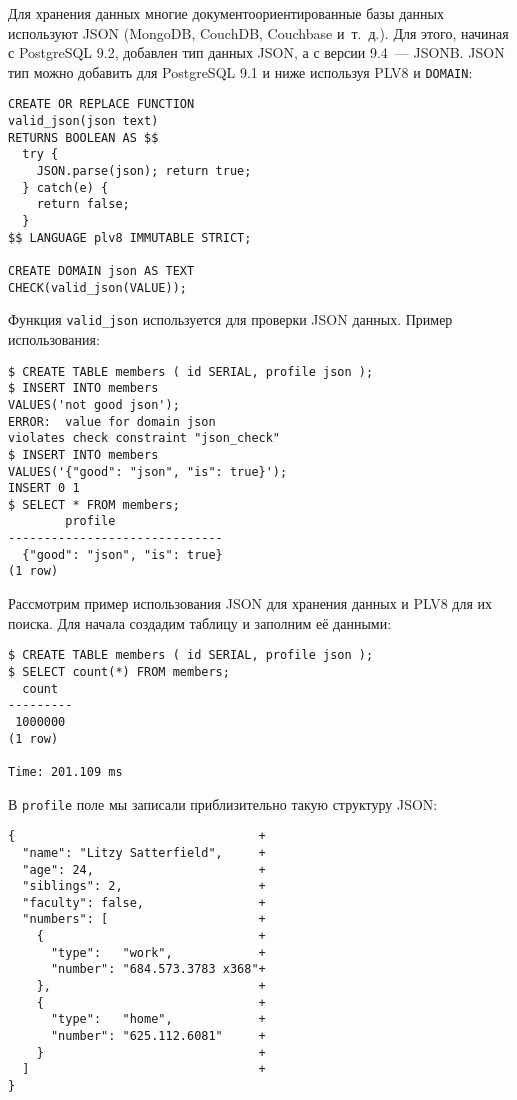 Для хранения данных многие документоориентированные базы данных используют JSON (MongoDB, CouchDB, Couchbase и~т.~д.). Для этого, начиная с PostgreSQL 9.2, добавлен тип данных JSON, а с версии 9.4~--- JSONB. JSON тип можно добавить для PostgreSQL 9.1 и ниже используя PLV8 и \lstinline!DOMAIN!:

\begin{lstlisting}[label=lst:plv8js7,caption=Создание типа JSON]
CREATE OR REPLACE FUNCTION
valid_json(json text)
RETURNS BOOLEAN AS $$
  try {
    JSON.parse(json); return true;
  } catch(e) {
    return false;
  }
$$ LANGUAGE plv8 IMMUTABLE STRICT;

CREATE DOMAIN json AS TEXT
CHECK(valid_json(VALUE));
\end{lstlisting}

Функция \lstinline!valid_json! используется для проверки JSON данных. Пример использования:

\begin{lstlisting}[label=lst:plv8js8,caption=Проверка JSON]
$ CREATE TABLE members ( id SERIAL, profile json );
$ INSERT INTO members
VALUES('not good json');
ERROR:  value for domain json
violates check constraint "json_check"
$ INSERT INTO members
VALUES('{"good": "json", "is": true}');
INSERT 0 1
$ SELECT * FROM members;
	    profile
------------------------------
  {"good": "json", "is": true}
(1 row)
\end{lstlisting}

Рассмотрим пример использования JSON для хранения данных и PLV8 для их поиска. Для начала создадим таблицу и заполним её данными:

\begin{lstlisting}[label=lst:plv8js9,caption=Таблица с JSON полем]
$ CREATE TABLE members ( id SERIAL, profile json );
$ SELECT count(*) FROM members;
  count
---------
 1000000
(1 row)

Time: 201.109 ms
\end{lstlisting}

В \lstinline!profile! поле мы записали приблизительно такую структуру JSON:

\begin{lstlisting}[label=lst:plv8js10,caption=JSON структура]
{                                  +
  "name": "Litzy Satterfield",     +
  "age": 24,                       +
  "siblings": 2,                   +
  "faculty": false,                +
  "numbers": [                     +
    {                              +
      "type":   "work",            +
      "number": "684.573.3783 x368"+
    },                             +
    {                              +
      "type":   "home",            +
      "number": "625.112.6081"     +
    }                              +
  ]                                +
}
\end{lstlisting}

